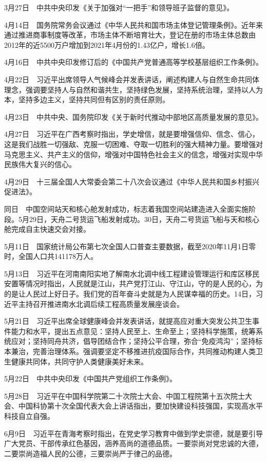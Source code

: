 \documentclass[10pt,a4paper,twocolumn]{book}
\begin{document}
3月27日　中共中央印发《关于加强对“一把手”和领导班子监督的意见》。

4月14日　国务院常务会议通过《中华人民共和国市场主体登记管理条例》。近年来通过推进商事制度等改革，市场主体不断培育壮大，登记在册的市场主体总数由2012年的近5500万户增加到2021年4月份的1.43亿户，增长1.6倍。

4月16日　中共中央印发修订后的《中国共产党普通高等学校基层组织工作条例》。

4月22日　习近平出席领导人气候峰会并发表讲话，阐述构建人与自然生命共同体理念，强调要坚持人与自然和谐共生，坚持绿色发展，坚持系统治理，坚持以人为本，坚持多边主义，坚持共同但有区别的责任原则。

4月23日　中共中央、国务院印发《关于新时代推动中部地区高质量发展的意见》。

4月27日　习近平在广西考察时指出，学史增信，就是要增强信仰、信念、信心，这是我们战胜一切强敌、克服一切困难、夺取一切胜利的强大精神力量。要增强对马克思主义、共产主义的信仰，增强对中国特色社会主义的信念，增强对实现中华民族伟大复兴的信心。

4月29日　十三届全国人大常委会第二十八次会议通过《中华人民共和国乡村振兴促进法》。

同日　中国空间站天和核心舱发射成功，标志着我国空间站建造进入全面实施阶段。5月29日，天舟二号货运飞船发射成功。30日，天舟二号货运飞船与天和核心舱完成自主快速交会对接。

5月11日　国家统计局公布第七次全国人口普查主要数据，截至2020年11月1日零时，全国人口共141178万人。

5月13日　习近平在河南南阳实地了解南水北调中线工程建设管理运行和库区移民安置等情况时指出，人民就是江山，共产党打江山、守江山，守的是人民的心，为的是让人民过上好日子。我们党的百年奋斗史就是为人民谋幸福的历史。14日，习近平主持召开推进南水北调后续工程高质量发展座谈会。

5月21日　习近平出席全球健康峰会并发表讲话，就提高应对重大突发公共卫生事件能力和水平，提出五点意见：坚持人民至上、生命至上；坚持科学施策，统筹系统应对；坚持同舟共济，倡导团结合作；坚持公平合理，弥合“免疫鸿沟”；坚持标本兼治，完善治理体系。强调要坚定不移推进抗疫国际合作，共同推动构建人类卫生健康共同体，共同守护人类健康美好未来。

5月22日　中共中央印发《中国共产党组织工作条例》。

5月28日　习近平在中国科学院第二十次院士大会、中国工程院第十五次院士大会、中国科协第十次全国代表大会上讲话指出，要加快建设科技强国，实现高水平科技自立自强。

6月9日　习近平在青海考察时指出，在党史学习教育中做到学史崇德，就是要引导广大党员、干部传承红色基因，涵养高尚的道德品质。一要崇尚对党忠诚的大德，二要崇尚造福人民的公德，三要崇尚严于律己的品德。
\end{document}
